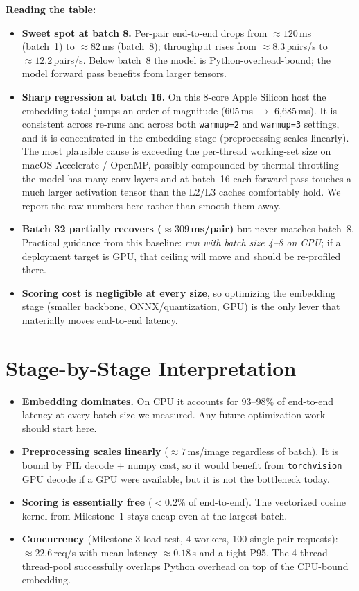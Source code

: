 \documentclass[11pt]{article}
\begin{document}
\textbf{Reading the table:}
\begin{itemize}[noitemsep, leftmargin=*]
    \item \textbf{Sweet spot at batch 8.} Per-pair end-to-end drops from
    $\approx 120$\,ms (batch~1) to $\approx 82$\,ms (batch~8); throughput rises from
    $\approx 8.3$\,pairs/s to $\approx 12.2$\,pairs/s. Below batch~8 the model is
    Python-overhead-bound; the model forward pass benefits from larger tensors.
    \item \textbf{Sharp regression at batch 16.} On this 8-core Apple Silicon host the
    embedding total jumps an order of magnitude (605\,ms $\to$ 6{,}685\,ms). It is
    consistent across re-runs and across both \texttt{warmup=2} and \texttt{warmup=3}
    settings, and it is concentrated in the embedding stage (preprocessing scales
    linearly). The most plausible cause is exceeding the per-thread working-set size
    on macOS Accelerate / OpenMP, possibly compounded by thermal throttling -- the
    model has many conv layers and at batch~16 each forward pass touches a much
    larger activation tensor than the L2/L3 caches comfortably hold. We report the
    raw numbers here rather than smooth them away.
    \item \textbf{Batch 32 partially recovers ($\approx 309$\,ms/pair)} but never
    matches batch~8. Practical guidance from this baseline: \emph{run with batch
    size 4--8 on CPU}; if a deployment target is GPU, that ceiling will move and
    should be re-profiled there.
    \item \textbf{Scoring cost is negligible at every size}, so optimizing the
    embedding stage (smaller backbone, ONNX/quantization, GPU) is the only lever
    that materially moves end-to-end latency.
\end{itemize}

\section{Stage-by-Stage Interpretation}
\begin{itemize}[noitemsep, leftmargin=*]
    \item \textbf{Embedding dominates.} On CPU it accounts for $93$--$98\%$ of
    end-to-end latency at every batch size we measured. Any future optimization
    work should start here.
    \item \textbf{Preprocessing scales linearly} ($\approx 7$\,ms/image regardless of
    batch). It is bound by PIL decode + numpy cast, so it would benefit from
    \texttt{torchvision} GPU decode if a GPU were available, but it is not the
    bottleneck today.
    \item \textbf{Scoring is essentially free} ($<0.2\%$ of end-to-end). The
    vectorized cosine kernel from Milestone~1 stays cheap even at the largest
    batch.
    \item \textbf{Concurrency} (Milestone 3 load test, 4 workers, 100 single-pair
    requests): $\approx 22.6$\,req/s with mean latency $\approx 0.18$\,s and a tight
    P95. The 4-thread thread-pool successfully overlaps Python overhead on top of
    the CPU-bound embedding.
\end{itemize}
\end{document}
